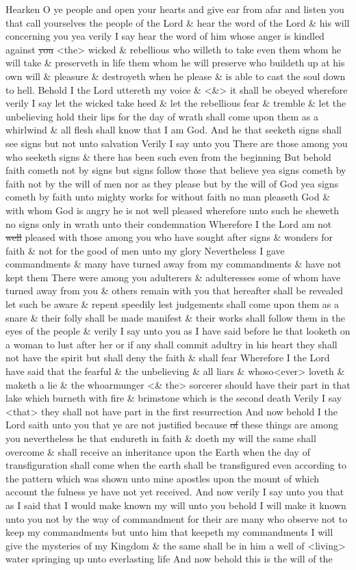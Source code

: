 {				Hearken O ye people and open your hearts and give ear from afar and listen you that call yourselves the people of the Lord \& hear the word of the Lord \& his will concerning you yea verily I say hear the word of him whose anger is kindled against \sout{you} <the> wicked \& rebellious who willeth to take even them whom he will take \& preserveth in life them whom he will preserve who buildeth up at his own will \& pleasure \& destroyeth when he please \& is able to cast the soul down to hell. Behold I the Lord uttereth my voice \& <\&> it shall be obeyed wherefore verily I say let the wicked take heed \& let the rebellious fear \& tremble \& let the unbelieving hold their lips for the day of wrath shall come upon them as a whirlwind \& all flesh shall know that I am God. And he that seeketh signs shall see signs but not unto salvation Verily I say unto you There are those among you who seeketh signs \& there has been such even from the beginning But behold faith cometh not by signs but signs follow those that believe yea signs cometh by faith not by the will of men nor as they please but by the will of God yea signs cometh by faith unto mighty works for without faith no man pleaseth God \& with whom God is angry he is not well pleased wherefore unto such he sheweth no signs only in wrath unto their condemnation Wherefore I the Lord am not \sout{well} pleased with those among you who have sought after signs \& wonders for faith \& not for the good of men unto my glory Nevertheless I gave commandments \& many have turned away from my commandments \& have not kept them There were among you adulterers \& adulteresses some of whom have turned away from you \& others remain with you that hereafter shall be revealed let such be aware \& repent speedily lest judgements shall come upon them as a snare \& their folly shall be made manifest \& their works shall follow them in the eyes of the people \& verily I say unto you as I have said before he that looketh on a woman to lust after her or if any shall commit adultry in his heart they shall not have the spirit but shall deny the faith \& shall fear Wherefore I the Lord have said that the fearful \& the unbelieving \& all liars \& whoso<ever> loveth \& maketh a lie \& the whoarmunger <\& the> sorcerer should have their part in that lake which burneth with fire \& brimstone which is the second death Verily I say <that> they shall not have part in the first resurrection And now behold I the Lord saith unto you that ye are not justified because \sout{of} these things are among you nevertheless he that endureth in faith \& doeth my will the same shall overcome \& shall receive an inheritance upon the Earth when the day of transfiguration shall come when the earth shall be transfigured even according to the pattern which was shown unto mine apostles upon the mount of which account the fulness ye have not yet received. And now verily I say unto you that as I said that I would make known my will unto you behold I will make it known unto you not by the way of commandment for their are many who observe not to keep my commandments but unto him that keepeth my commandments I will give the mysteries of my Kingdom \& the same shall be in him a well of <living> water springing up unto everlasting life And now behold this is the will of the }
